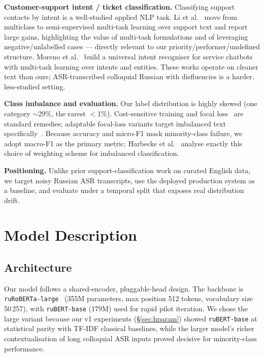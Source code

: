 \documentclass[11pt]{article}
\begin{document}
\textbf{Customer-support intent / ticket classification.} Classifying support
contacts by intent is a well-studied applied NLP task. Li et
al.~\cite{li2024semisupervised} move from multiclass to semi-supervised
multi-task learning over support text and report large gains, highlighting the
value of multi-task formulations and of leveraging negative/unlabelled cases ---
directly relevant to our priority/performer/undefined structure. Moreno et
al.~\cite{moreno2021universal} build a universal intent recogniser for service
chatbots with multi-task learning over intents and entities. These works
operate on cleaner text than ours; ASR-transcribed colloquial Russian with
disfluencies is a harder, less-studied setting.

\textbf{Class imbalance and evaluation.} Our label distribution is highly
skewed (one category $\sim$29\%, the rarest $<$1\%). Cost-sensitive training
and focal loss~\cite{lin2017focal} are standard remedies; adaptable focal-loss
variants target imbalanced text specifically~\cite{cao2022adaptable}. Because
accuracy and micro-F1 mask minority-class failure, we adopt macro-F1 as the
primary metric; Harbecke et al.~\cite{harbecke2022microf1} analyse exactly this
choice of weighting scheme for imbalanced classification.

\textbf{Positioning.} Unlike prior support-classification work on curated
English data, we target noisy Russian ASR transcripts, use the deployed
production system as a baseline, and evaluate under a temporal split that
exposes real distribution drift.

\section{Model Description}

\subsection{Architecture}
Our model follows a shared-encoder, pluggable-head design. The backbone is
\texttt{ruRoBERTa-large}~\cite{zmitrovich2024family} (355M parameters, max
position 512 tokens, vocabulary size 50\,257), with \texttt{ruBERT-base}
(179M) used for rapid pilot iteration. We chose the large variant because our
v1 experiments (\S\ref{sec:hparam}) showed \texttt{ruBERT-base} at statistical
parity with TF-IDF classical baselines, while the larger model's richer
contextualisation of long colloquial ASR inputs proved decisive for
minority-class performance.
\end{document}
